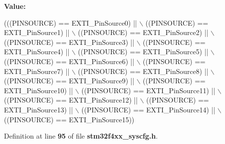 {\bfseries Value\+:}
\begin{DoxyCode}
(((PINSOURCE) == EXTI_PinSource0) || \(\backslash\)
                                       ((PINSOURCE) == EXTI_PinSource1) || \(\backslash\)
                                       ((PINSOURCE) == EXTI_PinSource2) || \(\backslash\)
                                       ((PINSOURCE) == EXTI_PinSource3) || \(\backslash\)
                                       ((PINSOURCE) == EXTI_PinSource4) || \(\backslash\)
                                       ((PINSOURCE) == EXTI_PinSource5) || \(\backslash\)
                                       ((PINSOURCE) == EXTI_PinSource6) || \(\backslash\)
                                       ((PINSOURCE) == EXTI_PinSource7) || \(\backslash\)
                                       ((PINSOURCE) == EXTI_PinSource8) || \(\backslash\)
                                       ((PINSOURCE) == EXTI_PinSource9) || \(\backslash\)
                                       ((PINSOURCE) == EXTI_PinSource10) || \(\backslash\)
                                       ((PINSOURCE) == EXTI_PinSource11) || \(\backslash\)
                                       ((PINSOURCE) == EXTI_PinSource12) || \(\backslash\)
                                       ((PINSOURCE) == EXTI_PinSource13) || \(\backslash\)
                                       ((PINSOURCE) == EXTI_PinSource14) || \(\backslash\)
                                       ((PINSOURCE) == EXTI_PinSource15))
\end{DoxyCode}


Definition at line \textbf{ 95} of file \textbf{ stm32f4xx\+\_\+syscfg.\+h}.

